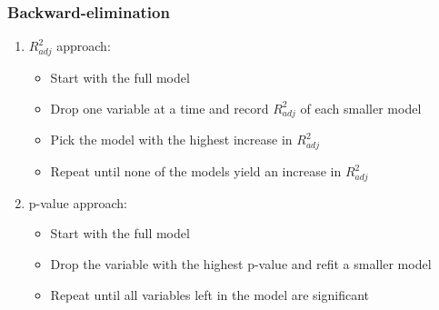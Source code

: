 
\begin{frame}
\frametitle{Backward-elimination}

\begin{enumerate}

\item $R^2_{adj}$ approach: 
\begin{itemize}
\item Start with the full model
\item Drop one variable at a time and record $R^2_{adj}$ of each smaller model
\item Pick the model with the highest increase in $R^2_{adj}$
\item Repeat until none of the models yield an increase in $R^2_{adj}$
\end{itemize}

\item p-value approach: 
\begin{itemize}
\item Start with the full model
\item Drop the variable with the highest p-value and refit a smaller model
\item Repeat until all variables left in the model are significant
\end{itemize}

\end{enumerate}

\end{frame}


